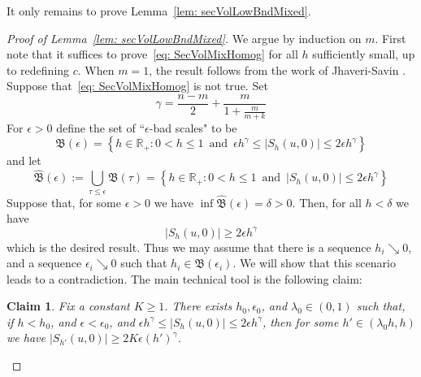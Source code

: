 \documentclass[12pt,reqno]{amsart}
\newtheorem{claim}{Claim}
\numberwithin{equation}{section}
\begin{document}
It only remains to prove Lemma~\ref{lem: secVolLowBndMixed}.

\begin{proof}[Proof of Lemma~\ref{lem: secVolLowBndMixed}]
We argue by induction on $m$.  First note that it suffices to prove~\eqref{eq: SecVolMixHomog} for all $h$ sufficiently small, up to redefining $c$.  When $m=1$, the result follows from the work of Jhaveri-Savin \cite[Theorem 1.4]{Jhaveri-Savin}. Suppose that~\eqref{eq: SecVolMixHomog} is not true.  Set
\[
\gamma = \frac{n-m}{2}+\frac{m}{1+\frac{m}{m+k}}
\]
For $\epsilon>0$ define the set of ``$\epsilon$-bad scales" to be
\[
\mathfrak{B}(\epsilon) = \left\{h \in \mathbb{R}_+ : 0<h \leq 1 \, \text{ and } \,\epsilon h^{\gamma} \leq |S_{h}(u,0)| \leq 2\epsilon h^{\gamma}\right\}
\]
and let
\[
\widehat{\mathfrak{B}}(\epsilon) := \bigcup_{\tau \leq \epsilon} \mathfrak{B}(\tau)= \left\{h \in \mathbb{R}_+ : 0<h \leq 1 \, \text{ and } \, |S_{h}(u,0)| \leq 2\epsilon h^{\gamma}\right\}
\]
Suppose that, for some $\epsilon >0$ we have $\inf \widehat{\mathfrak{B}}(\epsilon) = \delta >0$.  Then, for all $h<\delta$ we have
\[
|S_{h}(u,0)| \geq 2\epsilon h^{\gamma}
\]
which is the desired result.  Thus we may assume that there is a sequence $h_i \searrow 0$, and a sequence $\epsilon_i\searrow 0$ such that $h_i \in \mathfrak{B}(\epsilon_i)$.  We will show that this scenario leads to a contradiction.  The main technical tool is the following claim:

\begin{claim}\label{claim: noCollapsing}
Fix a constant $K\geq 1$.  There exists $h_0, \epsilon_0$, and $\lambda_0 \in (0,1)$ such that, if $h < h_0$, and $\epsilon < \epsilon_0$, and $\epsilon h^{\gamma} \leq |S_h(u,0)| \leq 2\epsilon h^{\gamma}$, then for some $h' \in (\lambda_0 h, h)$ we have $|S_{h'}(u,0)| \geq 2K\epsilon (h')^{\gamma}$.
\end{claim}


\end{proof}
\end{document}
